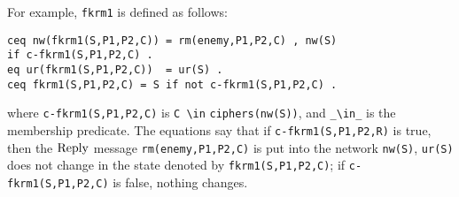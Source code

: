 \documentclass[a4paper,fleqn]{cas-dc}
\begin{document}
For example, \verb!fkrm1! is defined as follows:
\begin{verbatim}
ceq nw(fkrm1(S,P1,P2,C)) = rm(enemy,P1,P2,C) , nw(S) 
if c-fkrm1(S,P1,P2,C) .
eq ur(fkrm1(S,P1,P2,C))  = ur(S) .
ceq fkrm1(S,P1,P2,C) = S if not c-fkrm1(S,P1,P2,C) .
\end{verbatim}
\noindent
where \verb!c-fkrm1(S,P1,P2,C)! is \verb!C \in! \verb!ciphers(nw(S))!, and \verb!_\in_! is the membership predicate.
The equations say that if \verb!c-fkrm1(S,P1,P2,R)! is true, then the $\rm Reply$ message \verb!rm(enemy,P1,P2,C)! is put into the network \verb!nw(S)!, \verb!ur(S)! does not change in the state denoted by \verb!fkrm1(S,P1,P2,C)!; if \verb!c-fkrm1(S,P1,P2,C)! is false, nothing changes. 
\end{document}
